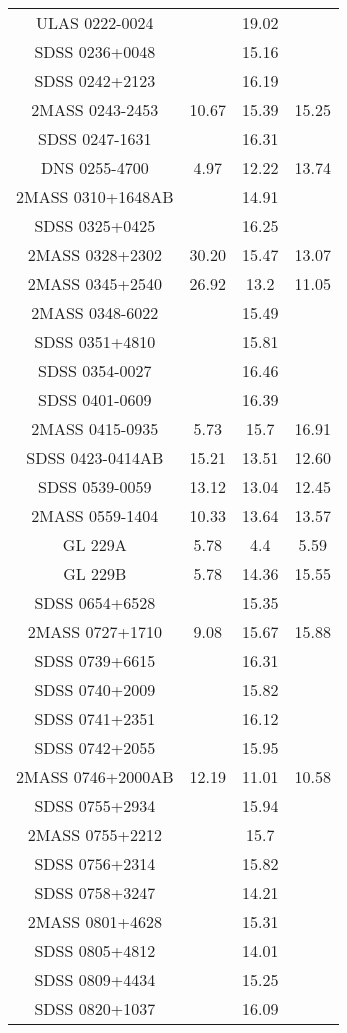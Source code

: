 \begin{table}
\begin{tabular}{cccc}
ULAS 0222-0024 &  & 19.02 &  \\
SDSS 0236+0048 &  & 15.16 &  \\
SDSS 0242+2123 &  & 16.19 &  \\
2MASS 0243-2453 & 10.67 & 15.39 & 15.25 \\
SDSS 0247-1631 &  & 16.31 &  \\
DNS 0255-4700 & 4.97 & 12.22 & 13.74 \\
2MASS 0310+1648AB &  & 14.91 &  \\
SDSS 0325+0425 &  & 16.25 &  \\
2MASS 0328+2302 & 30.20 & 15.47 & 13.07 \\
2MASS 0345+2540 & 26.92 & 13.2 & 11.05 \\
2MASS 0348-6022 &  & 15.49 &  \\
SDSS 0351+4810 &  & 15.81 &  \\
SDSS 0354-0027 &  & 16.46 &  \\
SDSS 0401-0609 &  & 16.39 &  \\
2MASS 0415-0935 & 5.73 & 15.7 & 16.91 \\
SDSS 0423-0414AB & 15.21 & 13.51 & 12.60 \\
SDSS 0539-0059 & 13.12 & 13.04 & 12.45 \\
2MASS 0559-1404 & 10.33 & 13.64 & 13.57 \\
GL 229A & 5.78 & 4.4 & 5.59 \\
GL 229B & 5.78 & 14.36 & 15.55 \\
SDSS 0654+6528 &  & 15.35 &  \\
2MASS 0727+1710 & 9.08 & 15.67 & 15.88 \\
SDSS 0739+6615 &  & 16.31 &  \\
SDSS 0740+2009 &  & 15.82 &  \\
SDSS 0741+2351 &  & 16.12 &  \\
SDSS 0742+2055 &  & 15.95 &  \\
2MASS 0746+2000AB & 12.19 & 11.01 & 10.58 \\
SDSS 0755+2934 &  & 15.94 &  \\
2MASS 0755+2212 &  & 15.7 &  \\
SDSS 0756+2314 &  & 15.82 &  \\
SDSS 0758+3247 &  & 14.21 &  \\
2MASS 0801+4628 &  & 15.31 &  \\
SDSS 0805+4812 &  & 14.01 &  \\
SDSS 0809+4434 &  & 15.25 &  \\
SDSS 0820+1037 &  & 16.09 &  \\

\end{tabular}
\end{table}
